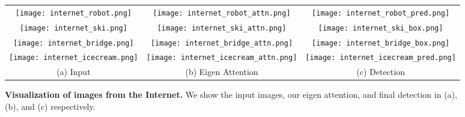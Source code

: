 \documentclass[twocolumn]{article}
\begin{document}
\begin{figure}[!t]

\centering
\begin{tabular}{c@{\hskip 3pt}c@{\hskip 3pt}c}
        \texttt{[image: internet\_robot.png]} &
        \texttt{[image: internet\_robot\_attn.png]}&
        \texttt{[image: internet\_robot\_pred.png]} \\

        \texttt{[image: internet\_ski.png]} &
        \texttt{[image: internet\_ski\_attn.png]}&
        \texttt{[image: internet\_ski\_box.png]} \\	
		
        \texttt{[image: internet\_bridge.png]} &
        \texttt{[image: internet\_bridge\_attn.png]}&
        \texttt{[image: internet\_bridge\_box.png]} \\
        
        \texttt{[image: internet\_icecream.png]} &
        \texttt{[image: internet\_icecream\_attn.png]}&
        \texttt{[image: internet\_icecream\_pred.png]} \\
        
        (a) Input & (b) Eigen Attention & (c) Detection \\ 
\end{tabular}

\caption{\textbf{Visualization of images from the Internet.} We show the input images, our eigen attention, and final detection in (a), (b), and (c) respectively.}
\label{fig:extra_samples}

\end{figure}
\end{document}
